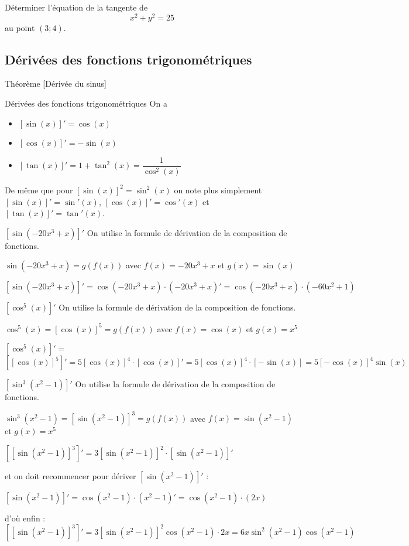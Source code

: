 \documentclass[a4paper,12pt]{article}
\begin{document}
\begin{exemple}
	\tcblower
	Déterminer l'équation de la tangente de 
	\[x^2+y^2=25\]
	au point $(3;4)$. 
	\vspace{6cm}
\end{exemple}
\subsection{Dérivées des fonctions trigonométriques}
Théorème [Dérivée du sinus]
\begin{thm}
Dérivées des fonctions trigonométriques
\tcblower
On a 
\begin{itemize}
	\item $[\sin(x)]' = \cos(x)$
	\item $[\cos(x)]' = -\sin(x)$
	\item $[\tan(x)]' = 1 + \tan^2(x) = \dfrac{1}{\cos^2(x)}$
\end{itemize}
\end{thm}


\begin{notation}
	\tcblower
De même que pour $[\sin(x)]^2 = \sin^2(x)$ on note plus simplement $[\sin(x)]' = \sin'(x)$, $[\cos(x)]' = \cos'(x)$ et $[\tan(x)]' = \tan'(x)$.
\end{notation}
\begin{exemple}
	$[\sin(-20x^3 + x)]'$
	\tcblower
On utilise la formule de dérivation de la composition de fonctions. 

$\sin(-20x^3 + x) = g(f(x))$ avec $f(x) = -20x^3 + x$ et $g(x) = \sin(x)$

$[\sin(-20x^3 + x)]' = \cos(-20x^3 + x) \cdot (-20x^3 + x)' = \cos(-20x^3 + x) \cdot (-60x^2 + 1)$


\end{exemple}

\begin{exemple}
	$[\cos^5(x)]'$
	\tcblower
On utilise la formule de dérivation de la composition de fonctions. 

$\cos^5(x) = [\cos(x)]^5 = g(f(x))$ avec $f(x) = \cos(x)$ et $g(x) = x^5$

$[\cos^5(x)]' =$
$[[\cos(x)]^5]' = 5[\cos(x)]^4 \cdot [\cos(x)]' = 5[\cos(x)]^4 \cdot [-\sin(x)] = 5[-\cos(x)]^4 \sin(x)$
\end{exemple}

\begin{exemple}
$[\sin^3(x^2 - 1)]'$
	\tcblower
On utilise la formule de dérivation de la composition de fonctions. 

$\sin^3(x^2 - 1) = [\sin(x^2 - 1)]^3 = g(f(x))$ avec $f(x) = \sin(x^2 - 1)$ et $g(x) = x^5$

$[[\sin(x^2 - 1)]^3]' = 3[\sin(x^2 - 1)]^2 \cdot [\sin(x^2 - 1)]'$

et on doit recommencer pour dériver $[\sin(x^2 - 1)]'$ :

$[\sin(x^2 - 1)]' = \cos(x^2 - 1) \cdot (x^2 - 1)' = \cos(x^2 - 1) \cdot (2x)$

d'où enfin : $[[\sin(x^2 - 1)]^3]' = 3[\sin(x^2 - 1)]^2 \cos(x^2 - 1) \cdot 2x = 6x\sin^2(x^2 - 1)\cos(x^2 - 1)$
\end{exemple}
\end{document}
